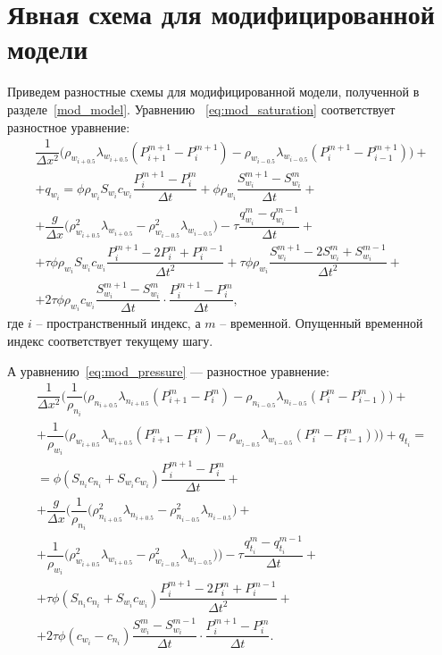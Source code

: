 \section{Явная схема для модифицированной модели}
\label{mod_model_explicit}
Приведем разностные схемы для модифицированной модели, полученной в разделе~\ref{mod_model}.
Уравнению ~\eqref{eq:mod_saturation} соответствует разностное уравнение:
\begin{equation} \label{eq:mod_scheme_s}
 \begin{gathered} 
   \dfrac{1}{\Delta x^2} \bigg(\rho_{w_{i+0.5}} \lambda_{w_{i+0.5}} (P_{i+1}^{m+1} - P_i^{m+1})
  - \rho_{w_{i-0.5}} \lambda_{w_{i-0.5}} (P_i^{m+1} - P_{i-1}^{m+1}) \bigg) +\\
  + q_{w_i} = \phi\rho_{w_i}S_{w_i}c_{w_i} \dfrac{P_i^{m+1} - P_i^m}{\Delta t} + \phi\rho_{w_i} \dfrac{S_{w_i}^{m+1} - S_{w_i}^m}{\Delta t} +\\ 
  + \dfrac{g}{\Delta x} \bigg(\rho_{w_{i+0.5}}^2 \lambda_{w_{i+0.5}} - \rho_{w_{i-0.5}}^2 \lambda_{w_{i-0.5}} \bigg)
  - \tau \dfrac{q_{w_i}^m-q_{w_i}^{m-1}}{\Delta t} + \\
  + \tau \phi \rho_{w_i}S_{w_i}c_{w_i} \dfrac{P_i^{m+1}-2P_i^m+P_i^{m-1}}{\Delta t^2}
  + \tau \phi \rho_{w_i} \dfrac{S_{w_i}^{m+1}-2S_{w_i}^m+S_{w_i}^{m-1}}{\Delta t^2} +\\
  + 2 \tau \phi \rho_{w_i} c_{w_i} \dfrac{S_{w_i}^{m+1}-S_{w_i}^{m}}{\Delta t} \cdot \dfrac{P_i^{m+1}-P_i^m}{\Delta t},
 \end{gathered}
\end{equation}
где $i$ -- пространственный индекс, а $m$ -- временной. Опущенный временной индекс соответствует текущему шагу.

А уравнению~\eqref{eq:mod_pressure} --- разностное уравнение:
\begin{equation} \label{eq:mod_scheme_p}
 \begin{gathered} 
  \dfrac{1}{\Delta x^2} \bigg(\dfrac{1}{\rho_{n_i}} \big( \rho_{n_{i+0.5}} \lambda_{n_{i+0.5}} (P_{i+1}^m - P_i^m)
  - \rho_{n_{i-0.5}} \lambda_{n_{i-0.5}} (P_i^m - P_{i-1}^m)\big) + \\
  + \dfrac{1}{\rho_{w_i}} \big( \rho_{w_{i+0.5}} \lambda_{w_{i+0.5}} (P_{i+1}^m - P_i^m)
  - \rho_{w_{i-0.5}} \lambda_{w_{i-0.5}} (P_i^m - P_{i-1}^m)\big)\bigg) + q_{t_i} = \\
  = \phi(S_{n_i}c_{n_i}+S_{w_i}c_{w_i}) \dfrac{P_i^{m+1} - P_i^m}{\Delta t} +\\
  + \dfrac{g}{\Delta x} \bigg(\dfrac{1}{\rho_{n_i}} \big( \rho_{n_{i+0.5}}^2 \lambda_{n_{i+0.5}} 
  - \rho_{n_{i-0.5}}^2 \lambda_{n_{i-0.5}} \big) + \\
  + \dfrac{1}{\rho_{w_i}} \big( \rho_{w_{i+0.5}}^2 \lambda_{w_{i+0.5}} 
  - \rho_{w_{i-0.5}}^2 \lambda_{w_{i-0.5}} \big)\bigg)
  - \tau \dfrac{q_{t_i}^m-q_{t_i}^{m-1}}{\Delta t} + \\
  + \tau \phi (S_{n_i}c_{n_i}+S_{w_i}c_{w_i}) \dfrac{P_i^{m+1}-2P_i^m+P_i^{m-1}}{\Delta t^2} +\\
  + 2 \tau \phi (c_{w_i}-c_{n_i}) \dfrac{S_{w_i}^m-S_{w_i}^{m-1}}{\Delta t} \cdot \dfrac{P_i^{m+1}-P_i^m}{\Delta t}.
 \end{gathered}
\end{equation}


